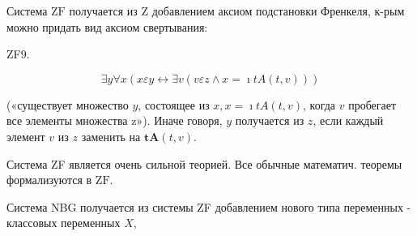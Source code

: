 \documentclass[10pt]{article}
\begin{document}
Система $\mathrm{ZF}$ получается из $\mathrm{Z}$ добавлением аксиом подстановки Френкеля, к-рым можно придать вид аксиом свертывания:



ZF9.



\[

\exists y \forall x(x \varepsilon y \leftrightarrow \exists v(v \varepsilon z \wedge x=\imath t A(t, v)))

\]



(«существует множество $y$, состоящее из $x, x=\imath t A(t, v)$, когда $v$ пробегает все элементы множества z»). Иначе говоря, $y$ получается из $z$, если каждый элемент $v$ из $z$ заменить на $\boldsymbol{t} \boldsymbol{A}(t, v)$.



Система ZF является очень сильной теорией. Все обычные математич. теоремы формализуются в $\mathrm{ZF}$.



Система NBG получается из системы ZF добавлением нового типа переменных - классовых переменных $X$,
\end{document}

